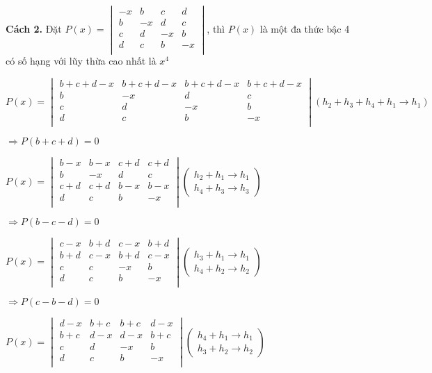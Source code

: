 \documentclass[12pt]{report}
\begin{document}
\textbf{Cách 2.} Đặt $P(x) = \begin{vmatrix}
-x & b & c & d \\
b & -x & d & c \\
c & d & -x & b \\
d & c & b & -x \\
\end{vmatrix}$, thì $P(x)$ là một đa thức bậc 4 có số hạng với lũy thừa cao nhất là $x^4$

$P(x) = \begin{vmatrix}
b+c+d-x & b+c+d-x & b+c+d-x & b+c+d-x \\
b & -x & d & c \\
c & d & -x & b \\
d & c & b & -x \\
\end{vmatrix} (h_2+h_3+h_4+h_1 \to h_1)$

$\Rightarrow P(b+c+d) = 0$

$P(x) = \begin{vmatrix}
	b-x & b-x & c+d & c+d \\
	b & -x & d & c \\
	c+d & c+d & b-x & b-x \\
	d & c & b & -x \\
\end{vmatrix} \left( \begin{smallmatrix}
h_2+h_1 \to h_1\\
h_4+h_3 \to h_3
\end{smallmatrix} \right)$

$\Rightarrow P(b-c-d) = 0$

$P(x) = \begin{vmatrix}
	c-x & b+d & c-x & b+d \\
	b+d & c-x & b+d & c-x \\
	c & c & -x & b \\
	d & c & b & -x \\
\end{vmatrix} \left( \begin{smallmatrix}
	h_3+h_1 \to h_1\\
	h_4+h_2 \to h_2
\end{smallmatrix} \right)$

$\Rightarrow P(c-b-d) = 0$

$P(x) = \begin{vmatrix}
	d-x & b+c & b+c & d-x \\
	b+c & d-x & d-x & b+c \\
	c & d & -x & b \\
	d & c & b & -x \\
\end{vmatrix} \left( \begin{smallmatrix}
	h_4+h_1 \to h_1\\
	h_3+h_2 \to h_2
\end{smallmatrix} \right)$
\end{document}

